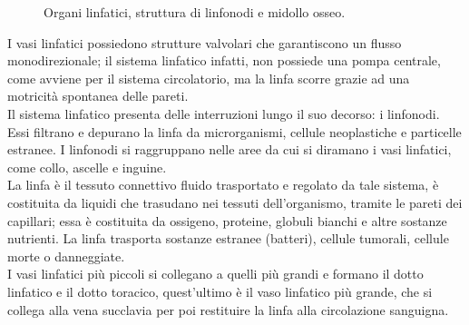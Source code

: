 \begin{figure}[H]
    \begin{center}
    \vspace{-3mm}
    \end{center}
    \caption{Organi linfatici, struttura di linfonodi e midollo osseo.
    \cite{img2}}
    \label{fig:FIGURE_1.2}
\end{figure}

I vasi linfatici possiedono strutture valvolari che garantiscono un flusso monodirezionale; 
il sistema linfatico infatti, non possiede una pompa centrale, 
come avviene per il sistema circolatorio, ma la linfa scorre grazie ad una motricità spontanea delle pareti.\\
Il sistema linfatico presenta delle interruzioni lungo il suo decorso: i linfonodi. 
Essi filtrano e depurano la linfa da microrganismi, cellule neoplastiche e particelle estranee\cite{BOOK1}. 
I linfonodi si raggruppano nelle aree da cui si diramano i vasi linfatici, come collo, ascelle e inguine.\\
La linfa è il tessuto connettivo fluido trasportato e regolato da tale sistema, è costituita 
da liquidi che trasudano nei tessuti dell'organismo, tramite le pareti dei capillari; essa è costituita 
da ossigeno, proteine, globuli bianchi e altre sostanze nutrienti\cite{BOOK1}. 
La linfa trasporta sostanze estranee (batteri), cellule tumorali, cellule morte o danneggiate.\\ 
I vasi linfatici più piccoli si collegano a quelli più grandi e formano il dotto linfatico e il dotto 
toracico, quest'ultimo è il vaso linfatico più grande, che si collega alla vena succlavia per poi restituire 
la linfa alla circolazione sanguigna\cite{BOOK1}.

